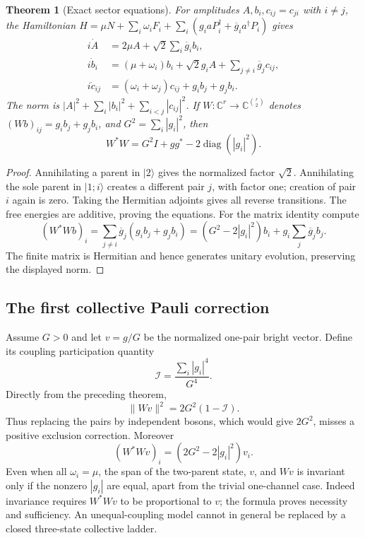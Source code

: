 \documentclass[11pt]{article}
\newtheorem{theorem}{Theorem}[section]
\theoremstyle{remark}
\begin{document}
\begin{theorem}[Exact sector equations]
\label{thm:v20v57-sector}
For amplitudes \(A,b_i,c_{ij}=c_{ji}\) with \(i\ne j\),
the Hamiltonian
\(H=\mu N+\sum_i\omega_iF_i+
\sum_i(g_i aP_i^\dagger+\overline g_i a^\dagger P_i)\)
gives
\[
 \begin{aligned}
 i\dot A&=2\mu A+\sqrt2\sum_i\overline g_i b_i,\\
 i\dot b_i&=(\mu+\omega_i)b_i+\sqrt2 g_i A+
                                    \sum_{j\ne i}\overline g_jc_{ij},\\
 i\dot c_{ij}&=(\omega_i+\omega_j)c_{ij}+g_i b_j+g_j b_i .
 \end{aligned}
\]
The norm is \(|A|^2+\sum_i|b_i|^2+\sum_{i<j}|c_{ij}|^2\).
If \(W:\mathbb C^r\to\mathbb C^{\binom r2}\) denotes
\((Wb)_{ij}=g_i b_j+g_j b_i\), and
\(G^2=\sum_i|g_i|^2\), then
\[
 W^*W=G^2I+gg^*-2\operatorname{diag}(|g_i|^2).
\]
\end{theorem}
\begin{proof}
Annihilating a parent in \(|2\rangle\) gives the normalized
factor \(\sqrt2\).  Annihilating the sole parent in
\(|1;i\rangle\) creates a different pair \(j\), with factor
one; creation of pair \(i\) again is zero.  Taking the
Hermitian adjoints gives all reverse transitions.
The free energies are additive, proving the equations.
For the matrix identity compute
\[
 (W^*Wb)_i=\sum_{j\ne i}\overline g_j(g_i b_j+g_j b_i)
          =(G^2-2|g_i|^2)b_i+
                          g_i\sum_j\overline g_jb_j .
\]
The finite matrix is Hermitian and hence generates unitary
evolution, preserving the displayed norm.
\end{proof}

\subsection{The first collective Pauli correction}

Assume \(G>0\) and let \(v=g/G\) be the normalized
one-pair bright vector.  Define its coupling participation
quantity
\[
 \mathcal I=\frac{\sum_i|g_i|^4}{G^4}.
\]
Directly from the preceding theorem,
\[
 \|Wv\|^2=2G^2(1-\mathcal I).
\]
Thus replacing the pairs by independent bosons, which would
give \(2G^2\), misses a positive exclusion correction.
Moreover
\[
 (W^*Wv)_i=(2G^2-2|g_i|^2)v_i.
\]
Even when all \(\omega_i=\mu\), the span of the two-parent
state, \(v\), and \(Wv\) is invariant only if the nonzero
\(|g_i|\) are equal, apart from the trivial one-channel case.
Indeed invariance requires \(W^*Wv\) to be proportional to
\(v\); the formula proves necessity and sufficiency.
An unequal-coupling model cannot in general be replaced by
a closed three-state collective ladder.
\end{document}
